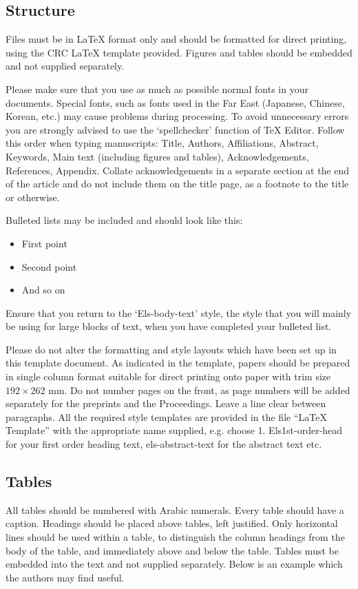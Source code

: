 \documentclass[3p,times,procedia]{elsarticle}
\begin{document}
\subsection{ Structure}
Files must be in LaTeX format only and should be formatted for direct printing, using the CRC LaTeX template provided. Figures and tables should be embedded and not supplied separately. 

Please make sure that you use as much as possible normal fonts in your documents. Special fonts, such as fonts used in the Far East (Japanese, Chinese, Korean, etc.) may cause problems during processing. To avoid unnecessary errors you are strongly advised to use the `spellchecker' function of TeX Editor. Follow this order when typing manuscripts: Title, Authors, Affiliations, Abstract, Keywords, Main text (including figures and tables), Acknowledgements, References, Appendix. Collate acknowledgements in a separate section at the end of the article and do not include them on the title page, as a footnote to the title or otherwise.

Bulleted lists may be included and should look like this:
\begin{itemize}[]
\item First point
\item Second point
\item And so on
\end{itemize}

Ensure that you return to the `Els-body-text' style, the style that you will mainly be using for large blocks of text, when you have completed your bulleted list. 

Please do not alter the formatting and style layouts which have been set up in this template document. As indicated in the template, papers should be prepared in single column format suitable for direct printing onto paper with trim size $192 \times 262$ mm. Do not number pages on the front, as page numbers will be added separately for the preprints and the Proceedings. Leave a line clear between paragraphs. All the required style templates are provided in the file ``LaTeX Template'' with the appropriate name supplied, e.g. choose 1. Els1st-order-head for your first order heading text, els-abstract-text for the abstract text etc.

\subsection{ Tables}

All tables should be numbered with Arabic numerals. Every table should have a caption. Headings should be placed above tables, left justified. Only horizontal lines should be used within a table, to distinguish the column headings from the body of the table, and immediately above and below the table. Tables must be embedded into the text and not supplied separately. Below is an example which the authors may find useful.
\end{document}
